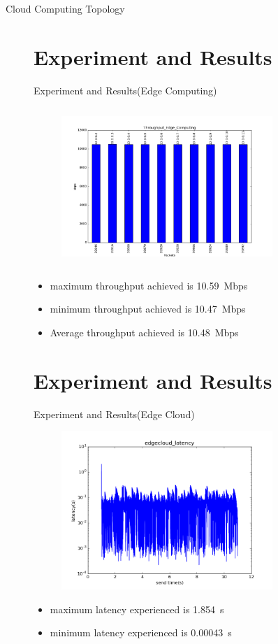 \documentclass{beamer}
\begin{document}
\begin{frame}{Cloud Computing Topology}
\begin{figure}
\section{Experiment and Results}
\begin{frame}{Experiment and Results\big(Edge Computing\big)}
\begin{figure}
\includegraphics[width=8cm, height=6cm]{edgecompthrough}
\centering
\end{figure}
\begin{itemize}

	\item maximum throughput achieved is \SI{10.59}Mbps
	\item minimum throughput achieved is \SI{10.47}Mbps
	\item Average throughput achieved is \SI{10.48}Mbps
\end{itemize}

\end{frame}

\section{Experiment and Results}
\begin{frame}{Experiment and Results\big(Edge Cloud\big)}
\begin{figure}
\includegraphics[width=8cm, height=6cm]{edgecloudlog26}
\centering
\end{figure}
\begin{itemize}
	\item maximum latency experienced is \SI{1.854}{\second}
	\item minimum latency experienced is \SI{.00043}{\second} 
\end{itemize}


\end{frame}
\end{figure}
\end{frame}
\end{document}
